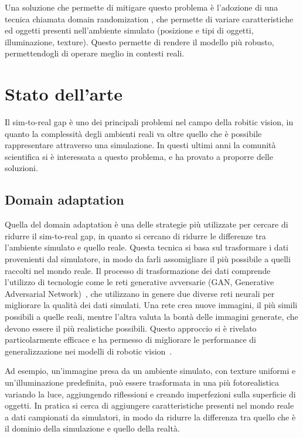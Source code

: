 \documentclass[12pt]{report}
\begin{document}
Una soluzione che permette di mitigare questo problema è l'adozione di una tecnica chiamata domain randomization , che permette di variare caratteristiche ed oggetti presenti nell'ambiente simulato (posizione e tipi di oggetti, illuminazione, texture). Questo permette di rendere il modello più robusto, permettendogli di operare meglio in contesti reali.

\chapter{Stato dell'arte}
\label{chap:stato_arte}

Il sim-to-real gap è uno dei principali problemi nel campo della robitic vision, in quanto la complessità degli ambienti reali va oltre quello che è possibile rappresentare attraverso una simulazione. In questi ultimi anni la comunità scientifica si è interessata a questo problema, e ha provato a proporre delle soluzioni.

\section{Domain adaptation}
\label{sec:adaptation}

Quella del domain adaptation è una delle strategie più utilizzate per cercare di ridurre il sim-to-real gap, in quanto si cercano di ridurre le differenze tra l'ambiente simulato e quello reale. Questa tecnica si basa sul trasformare i dati provenienti dal simulatore, in modo da farli assomigliare il più possibile a quelli raccolti nel mondo reale. Il processo di trasformazione dei dati comprende l'utilizzo di tecnologie come le reti generative avversarie (GAN, Generative Adversarial Network)~\cite{10.1145/3422622}, che utilizzano in genere due diverse reti neurali per migliorare la qualità dei dati simulati. Una rete crea nuove immagini, il più simili possibili a quelle reali, mentre l'altra valuta la bontà delle immagini generate, che devono essere il più realistiche possibili. Questo approccio si è rivelato particolarmente efficace e ha permesso di migliorare le performance di generalizzazione nei modelli di robotic vision~\cite{Shrivastava_2017_CVPR}.

Ad esempio, un'immagine presa da un ambiente simulato, con texture uniformi e un'illuminazione predefinita, può essere trasformata in una più fotorealistica variando la luce, aggiungendo riflessioni e creando imperfezioni sulla superficie di oggetti. In pratica si cerca di aggiungere caratteristiche presenti nel mondo reale a dati campionati da simulatori, in modo da ridurre la differenza tra quello che è il dominio della simulazione e quello della realtà.
\end{document}
